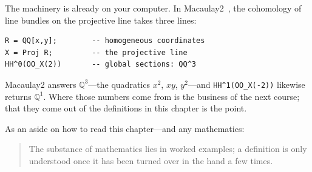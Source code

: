 The machinery is already on your computer. In
Macaulay2~\autocite{M2}, the cohomology of line bundles on the
projective line takes three lines:

\begin{Verbatim}
R = QQ[x,y];        -- homogeneous coordinates
X = Proj R;         -- the projective line
HH^0(OO_X(2))       -- global sections: QQ^3
\end{Verbatim}

\noindent Macaulay2 answers $\mathbb{Q}^{3}$---the quadratics $x^{2}$,
$xy$, $y^{2}$---and \texttt{HH\^{}1(OO\_X(-2))} likewise returns
$\mathbb{Q}^{1}$. Where those numbers come from is the business of the
next course; that they come out of the definitions in this chapter is
the point.

As an aside on how to read this chapter---and any mathematics:
\begin{quotation}
  The substance of mathematics lies in worked examples; a definition is
  only understood once it has been turned over in the hand a few times.
\end{quotation}
